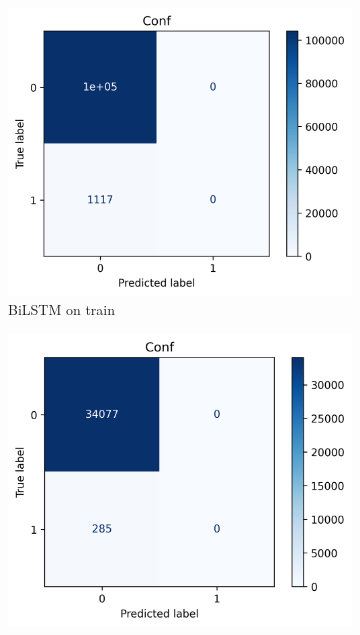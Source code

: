 \documentclass[utf8x]{ctexart}
\begin{document}
\begin{figure}[htb]
  \centering
  \begin{subfigure}[b]{0.32\textwidth}
    \centering
    \includegraphics[width=\textwidth]{../images/BiLSTM_train_conf.png}
    \caption{BiLSTM on train}
    \label{fig:BiLSTM_confusion_train}
  \end{subfigure}
  \begin{subfigure}[b]{0.32\textwidth}
    \centering
    \includegraphics[width=\textwidth]{../images/BiLSTM_val_conf.png}

\end{subfigure}
\end{figure}
\end{document}

